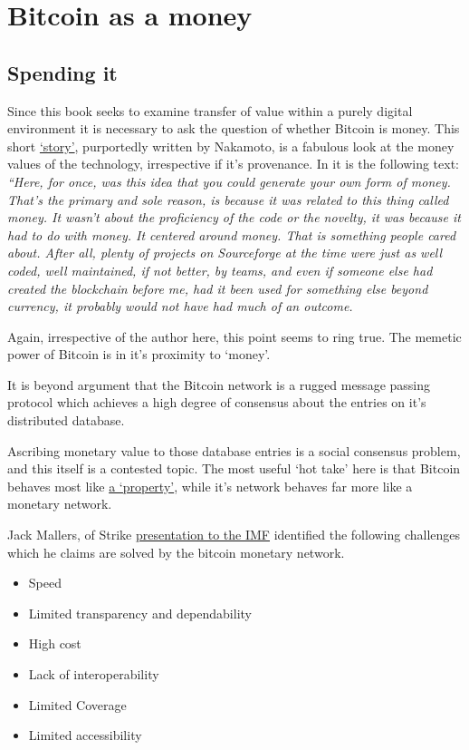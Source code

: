 \section{Bitcoin as a money}
\subsection{Spending it}
Since this book seeks to examine transfer of value within a purely digital environment it is necessary to ask the question of whether Bitcoin is money. This short \href{https://bitcoin-zar.blogspot.com/2018/07/duality-excerpt-by-satoshi-nakomoto.html}{`story'}, purportedly written by Nakamoto, is a fabulous look at the money values of the technology, irrespective if it's provenance. In it is the following text: \textit{``Here, for once, was this idea that you could generate your own form of money. That's the primary and sole reason, is because it was related to this thing called money. It wasn't about the proficiency of the code or the novelty, it was because it had to do with money. It centered around money. That is something people cared about. After all, plenty of projects on Sourceforge at the time were just as well coded, well maintained, if not better, by teams, and even if someone else had created the blockchain before me, had it been used for something else beyond currency, it probably would not have had much of an outcome.}\par
Again, irrespective of the author here, this point seems to ring true. The memetic power of Bitcoin is in it's proximity to `money'.\par
It is beyond argument that the Bitcoin network is a rugged message passing protocol which achieves a high degree of consensus about the entries on it's distributed database.\par Ascribing monetary value to those database entries is a social consensus problem, and this itself is a contested topic. The most useful `hot take' here is that Bitcoin behaves most like \href{https://twitter.com/saylor/status/1395788419301773312}{a `property'}, while it's network behaves far more like a monetary network. \par
Jack Mallers, of Strike \href{https://www.youtube.com/watch?v=jb-45m9f76I}{presentation to the IMF} identified the following challenges which he claims are solved by the bitcoin monetary network.
\begin{itemize}
\item Speed
\item Limited transparency and dependability
\item High cost
\item Lack of interoperability
\item Limited Coverage
\item Limited accessibility
\end{itemize}
